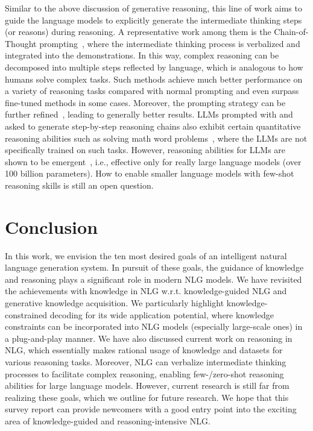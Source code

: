 Similar to the above discussion of generative reasoning, this line of work aims to guide the language models to explicitly generate the intermediate thinking steps (or reasons) during reasoning.
A representative work among them is the Chain-of-Thought prompting~\cite{wei2022chain}, where the intermediate thinking process is verbalized and integrated into the demonstrations.
In this way, complex reasoning can be decomposed into multiple steps reflected by language, which is analogous to how humans solve complex tasks.
Such methods achieve much better performance on a variety of reasoning tasks compared with normal prompting and even surpass fine-tuned methods in some cases.
Moreover, the prompting strategy can be further refined~\cite{wang2022self,zhou2022least,creswell2022selection}, leading to generally better results.
LLMs prompted with and asked to generate step-by-step reasoning chains also exhibit certain quantitative reasoning abilities such as solving math word problems~\cite{wei2022chain}, where the LLMs are not specifically trained on such tasks.
However, reasoning abilities for LLMs are shown to be emergent~\cite{wei2022chain,wei2022emergent}, i.e., effective only for really large language models (over 100 billion parameters).
How to enable smaller language models with few-shot reasoning skills is still an open question.


\section{Conclusion}
\label{sec:conclusion}

In this work, we envision the ten most desired goals of an intelligent natural language generation system.
In pursuit of these goals, the guidance of knowledge and reasoning plays a significant role in modern NLG models.
We have revisited the achievements with knowledge in NLG w.r.t. knowledge-guided NLG and generative knowledge acquisition.
We particularly highlight knowledge-constrained decoding for its wide application potential, where knowledge constraints can be incorporated into NLG models (especially large-scale ones) in a plug-and-play manner.
We have also discussed current work on reasoning in NLG, which essentially makes rational usage of knowledge and datasets for various reasoning tasks.
Moreover, NLG can verbalize intermediate thinking processes to facilitate complex reasoning, enabling few-/zero-shot reasoning abilities for large language models.
However, current research is still far from realizing these goals, which we outline for future research.
We hope that this survey report can provide newcomers with a good entry point into the exciting area of knowledge-guided and reasoning-intensive NLG.
